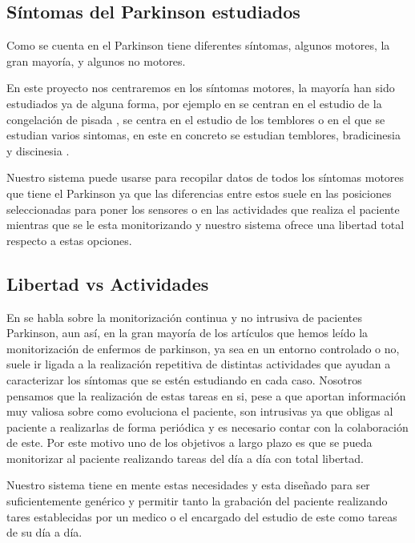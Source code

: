 \documentclass[11pt,spanish]{article}
\begin{document}
\subsection{Síntomas del Parkinson estudiados}
Como se cuenta en \cite{resumen2} el Parkinson tiene diferentes síntomas, algunos motores, la gran mayoría, y algunos no motores. 
\newline

En este proyecto nos centraremos en los síntomas motores, la mayoría han sido estudiados ya de alguna forma, por ejemplo en \cite{resumen3} se centran en el estudio de la congelación de pisada \cite{Gait}, \cite{resumen5} se centra en el estudio de los temblores o \cite{resumen4} en el que se estudian varios sintomas, en este en concreto se estudian temblores, bradicinesia \cite{Hipocinesia} y discinesia \cite{Dyskinesia}.
\newline

Nuestro sistema puede usarse para recopilar datos de todos los síntomas motores que tiene el Parkinson ya que las diferencias entre estos suele en las posiciones seleccionadas para poner los sensores o en las actividades que realiza el paciente mientras que se le esta monitorizando y nuestro sistema ofrece una libertad total respecto a estas opciones.

\subsection{Libertad vs Actividades}

En \cite{resumen2} se habla sobre la monitorización continua y no intrusiva de pacientes Parkinson, aun así, en la gran mayoría de los artículos que hemos leído la monitorización de enfermos de parkinson, ya sea en un entorno controlado o no, suele ir ligada a la realización repetitiva de distintas actividades que ayudan a caracterizar los síntomas que se estén estudiando en cada caso. Nosotros pensamos que la realización de estas tareas en si, pese a que aportan información muy valiosa sobre como evoluciona el paciente, son intrusivas ya que obligas al paciente a realizarlas de forma periódica y es necesario contar con la colaboración de este. Por este motivo uno de los objetivos a largo plazo es que se pueda monitorizar al paciente realizando tareas del día a día con total libertad.
\newline

Nuestro sistema tiene en mente estas necesidades y esta diseñado para ser suficientemente genérico y permitir tanto la grabación del paciente realizando tares establecidas por un medico o el encargado del estudio de este como tareas de su día a día.
\end{document}
